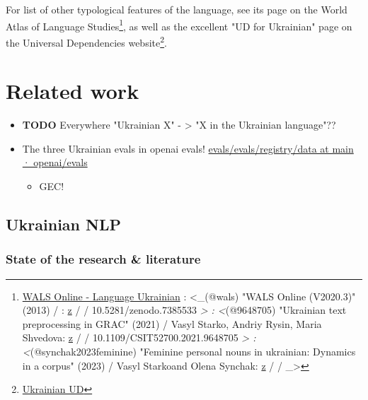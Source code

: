 For list of other typological features of the language, see its page on
the World Atlas of Language Studies\cite{wals}\footnote{\href{https://wals.info/languoid/lect/wals_code_ukr}{WALS
  Online - Language Ukrainian} \cite{wals}: \textless\_(@wals) "WALS
  Online (V2020.3)" (2013) / : \href{zotero://select/items/@wals}{z} /
  \href{}{} / 10.5281/zenodo.7385533 \emph{\textgreater{}
  \cite{9648705}: \textless{}}(@9648705) "Ukrainian text preprocessing
  in GRAC" (2021) / Vasyl Starko, Andriy Rysin, Maria Shvedova:
  \href{zotero://select/items/@9648705}{z} / \href{}{} /
  10.1109/CSIT52700.2021.9648705 \emph{\textgreater{}
  \cite{synchak2023feminine}: \textless{}}(@synchak2023feminine)
  "Feminine personal nouns in ukrainian: Dynamics in a corpus" (2023) /
  Vasyl Starkoand Olena Synchak:
  \href{zotero://select/items/@synchak2023feminine}{z} / \href{}{} /
  \_\textgreater{}}, as well as the excellent "UD for Ukrainian" page on
the Universal Dependencies website\footnote{\href{https://universaldependencies.org/uk/index.html}{Ukrainian
  UD}}.

\chapter{Related work}\label{related-work}

\begin{itemize}
\tightlist
\item
  \textbf{TODO} Everywhere "Ukrainian X" - \textgreater{} "X in the
  Ukrainian language"??
\item
  The three Ukrainian evals in openai evals!
  \href{https://github.com/openai/evals/tree/main/evals/registry/data}{evals/evals/registry/data
  at main · openai/evals}

  \begin{itemize}
  \tightlist
  \item
    GEC!
  \end{itemize}
\end{itemize}

\section{Ukrainian NLP}\label{ukrainian-nlp}

\subsection{State of the research \&
literature}\label{state-of-the-research--literature}

